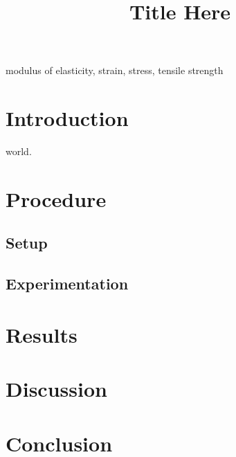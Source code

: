 \documentclass[10pt,journal,letterpaper]{IEEEtran}
\begin{document}
\title{Title Here}

\author{
}

\maketitle
\thispagestyle{empty}

\begin{abstract}
\lipsum[1]
\end{abstract}

\begin{IEEEkeywords}
modulus of elasticity, strain, stress, tensile strength 
\end{IEEEkeywords}

\section{Introduction}
 world. \lipsum[2-5]

\section{Procedure}

\subsection{Setup}

\lipsum[6]

\subsection{Experimentation}

\lipsum[7-8]

\section{Results}

\lipsum[9-10]

\section{Discussion}

\lipsum[11-20]

\section{Conclusion}
\end{document}
